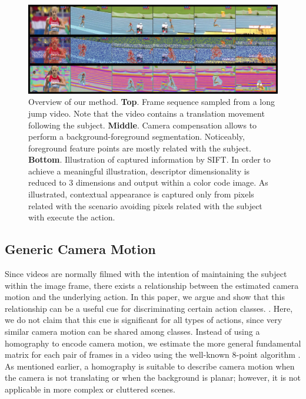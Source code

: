 \begin{figure}[t!]
\begin{center}
\includegraphics[width=0.98\linewidth]{fig/approach.png}
\end{center}
\caption{Overview of our method. \textbf{Top}. Frame sequence sampled from a long jump video. Note that the video contains a translation movement following the subject. \textbf{Middle}. Camera compensation allows to perform a background-foreground segmentation. Noticeably, foreground feature points are mostly related with the subject. \textbf{Bottom}. Illustration of captured information by SIFT. In order to achieve a meaningful illustration, descriptor dimensionality is reduced to 3 dimensions and output within a color code image. As illustrated, contextual appearance is captured only from pixels related with the scenario \ie avoiding pixels related with the subject with execute the action.}
\label{fig:approach}
\end{figure}


\subsection{Generic Camera Motion}
Since videos are normally filmed with the intention of maintaining the subject within the image frame, there exists a relationship between the estimated camera motion and the underlying action. In this paper, we argue and show that this relationship can be a useful cue for discriminating certain action classes. . Here, we do not claim that this cue is significant for all types of actions, since very similar camera motion can be shared among classes.  Instead of using a homography to encode camera motion, we estimate the more general fundamental matrix for each pair of frames in a video using the well-known 8-point algorithm \cite{eightpoint97}. As mentioned earlier, a homography is suitable to describe camera motion when the camera is not translating or when the background is planar; however, it is not applicable in more complex or cluttered scenes.


